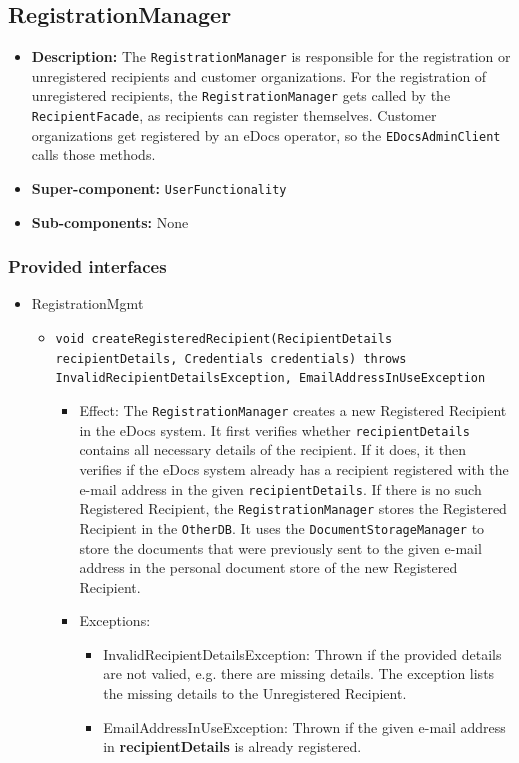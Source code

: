 \documentclass[a4paper,10pt]{article}
\begin{document}
\subsection{RegistrationManager}
\begin{itemize}
    \item \textbf{Description:} The \texttt{RegistrationManager} is responsible for the registration or unregistered recipients and customer organizations. For the registration of unregistered recipients, the \texttt{RegistrationManager} gets called by the \texttt{RecipientFacade}, as recipients can register themselves. Customer organizations get registered by an eDocs operator, so the \texttt{EDocsAdminClient} calls those methods.
    \item \textbf{Super-component:} \texttt{UserFunctionality}
    \item \textbf{Sub-components:} None
\end{itemize}

\subsubsection*{Provided interfaces}
\begin{itemize}
    \item RegistrationMgmt
    \begin{itemize}
        \item \texttt{void  createRegisteredRecipient(RecipientDetails recipientDetails, Credentials credentials) throws InvalidRecipientDetailsException, EmailAddressInUseException}
        \begin{itemize}
            \item Effect: The \texttt{RegistrationManager} creates a new Registered Recipient in the eDocs system. It first verifies whether \texttt{recipientDetails} contains all necessary details of the recipient. If it does, it then verifies if the eDocs system already has a recipient registered with the e-mail address in the given \texttt{recipientDetails}. If there is no such Registered Recipient, the \texttt{RegistrationManager} stores the Registered Recipient in the \texttt{OtherDB}. It uses the \texttt{DocumentStorageManager} to store the documents that were previously sent to the given e-mail address in the personal document store of the new Registered Recipient.
            \item Exceptions:
            \begin{itemize}
                	\item InvalidRecipientDetailsException: Thrown if the provided details are not valied, e.g. there are missing details. The exception lists the missing details to the Unregistered Recipient.
                	\item EmailAddressInUseException: Thrown if the given e-mail address in \textbf{recipientDetails} is already registered.
            \end{itemize}
        \end{itemize}
    \end{itemize}
\end{itemize}
\end{document}
